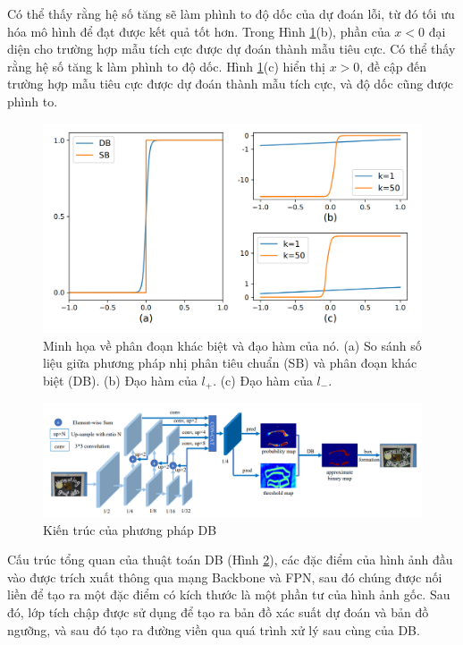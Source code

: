 Có thể thấy rằng hệ số tăng sẽ làm phình to độ dốc của dự đoán lỗi, từ đó tối ưu hóa mô hình để đạt được kết quả tốt hơn. Trong Hình \ref{fig11}(b), phần của $x < 0$ đại diện cho trường hợp mẫu tích cực được dự đoán thành mẫu tiêu cực. Có thể thấy rằng hệ số tăng k làm phình to độ dốc. Hình \ref{fig11}(c) hiển thị $x > 0$, đề cập đến trường hợp mẫu tiêu cực được dự đoán thành mẫu tích cực, và độ dốc cũng được phình to.

\begin{figure}[h]
    \includegraphics[scale=0.5]{chapter2/images/derivative-DB.png}
    \centering
    \caption{Minh họa về phân đoạn khác biệt và đạo hàm của nó. (a) So sánh số liệu giữa phương pháp nhị phân tiêu chuẩn (SB) và phân đoạn khác biệt (DB). (b) Đạo hàm của $l_+$. (c) Đạo hàm của $l_-$. \cite{liao2019realtime}}
    \label{fig11}
\end{figure}

\begin{figure}[h]
    \includegraphics[scale=0.45]{chapter2/images/architecture-db.png}
    \centering
    \caption{Kiến trúc của phương pháp DB}
    \label{fig12}
\end{figure}

Cấu trúc tổng quan của thuật toán DB (Hình \ref{fig12}), các đặc điểm của hình ảnh đầu vào được trích xuất thông qua mạng Backbone và FPN, sau đó chúng được nối liền để tạo ra một đặc điểm có kích thước là một phần tư của hình ảnh gốc. Sau đó, lớp tích chập được sử dụng để tạo ra bản đồ xác suất dự đoán và bản đồ ngưỡng, và sau đó tạo ra đường viền qua quá trình xử lý sau cùng của DB.

